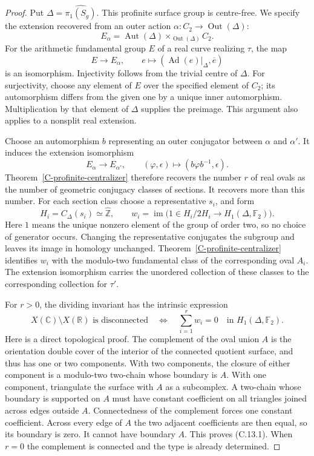 \documentclass[11pt,oneside]{article}
\begin{document}
\begin{proof}
Put $\Delta=\widehat{\pi_1(S_g)}$. This profinite surface group is
centre-free. We specify the extension recovered from an outer action
$\alpha:C_2\to\operatorname{Out}(\Delta)$:
\[
 E_\alpha=\operatorname{Aut}(\Delta)
       \mathbin{\times}_{\operatorname{Out}(\Delta)} C_2.
\]
For the arithmetic fundamental group $E$ of a real curve realizing
$\tau$, the map
\[
 E\longrightarrow E_\alpha,\qquad
 e\longmapsto(\operatorname{Ad}(e)|_\Delta,\overline e)
\]
is an isomorphism. Injectivity follows from the trivial centre of
$\Delta$. For surjectivity, choose any element of $E$ over the
specified element of $C_2$; its automorphism differs from the given
one by a unique inner automorphism. Multiplication by that element
of $\Delta$ supplies the preimage. This argument also applies to a
nonsplit real extension.

Choose an automorphism $b$ representing an outer conjugator between
$\alpha$ and $\alpha'$. It induces the extension isomorphism
\[
 E_\alpha\longrightarrow E_{\alpha'},\qquad
 (\varphi,\epsilon)\longmapsto
       (b\varphi b^{-1},\epsilon).
\]
Theorem~\ref{C-profinite-centralizer} therefore recovers the number
$r$ of real ovals as the number of geometric conjugacy classes of
sections. It recovers more than this number. For each section class
choose a representative $s_i$, and form
\[
 H_i=C_\Delta(s_i)\simeq\widehat{\mathbb Z},\qquad
 w_i=\operatorname{im}\bigl(
     1\in H_i/2H_i\longrightarrow H_1(\Delta,\mathbb F_2)\bigr).
\]
Here $1$ means the unique nonzero element of the group of order two,
so no choice of generator occurs. Changing the representative
conjugates the subgroup and leaves its image in homology unchanged.
Theorem~\ref{C-profinite-centralizer} identifies $w_i$ with the
modulo-two fundamental class of the corresponding oval $A_i$.
The extension isomorphism carries the unordered collection of these
classes to the corresponding collection for $\tau'$.

For $r>0$, the dividing invariant has the intrinsic expression
\[
 X(\mathbb C)\setminus X(\mathbb R)\text{ is disconnected}
 \quad\Longleftrightarrow\quad
 \sum_{i=1}^r w_i=0
       \quad\text{in }H_1(\Delta,\mathbb F_2).
\tag{C.13.1}
\]
Here is a direct topological proof. The complement of the oval union
$A$ is the orientation double cover of the interior of the connected
quotient surface, and thus has one or two components. With two
components, the closure of either component is a modulo-two
two-chain whose boundary is $A$. With one component, triangulate the
surface with $A$ as a subcomplex. A two-chain whose boundary is
supported on $A$ must have constant coefficient on all triangles
joined across edges outside $A$. Connectedness of the complement
forces one constant coefficient. Across every edge of $A$ the two
adjacent coefficients are then equal, so its boundary is zero.
It cannot have boundary $A$. This proves (C.13.1). When $r=0$ the
complement is connected and the type is already determined.


\end{proof}
\end{document}
